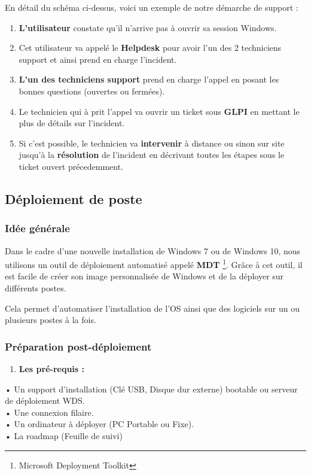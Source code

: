\documentclass[11pt,a4paper,oneside]{article}
\begin{document}
En détail du schéma ci-dessus, voici un exemple de notre démarche de support :

\begin{enumerate}
\item \textbf{L'utilisateur} constate qu'il n'arrive pas à ouvrir sa session Windows.
\item Cet utilisateur va appelé le \textbf{Helpdesk} pour avoir l'un des 2 techniciens support et ainsi prend en charge l'incident.
\item \textbf{L'un des techniciens support} prend en charge l'appel en posant les bonnes questions (ouvertes ou fermées).
\item Le technicien qui à prit l'appel va ouvrir un ticket sous \textbf{GLPI} en mettant le plus de détails sur l'incident.
\item  Si c'est possible, le technicien va \textbf{intervenir} à distance ou sinon sur site jusqu'à la \textbf{résolution} de l'incident en décrivant toutes les étapes sous le ticket ouvert précedemment.
\end{enumerate}

\newpage

\subsection{Déploiement de poste}
\subsubsection{Idée générale}

Dans le cadre d’une nouvelle installation de Windows 7 ou de Windows 10, nous utilisons un outil de déploiement automatisé appelé \textbf{MDT} \footnote{Microsoft Deployment Toolkit}.
Grâce à cet outil, il est facile de créer son image personnalisée de Windows et de la déployer sur différents postes.

Cela permet d’automatiser l’installation de l’OS ainsi que des logiciels sur un ou plusieurs postes à la fois.
\subsubsection{Préparation post-déploiement}
\begin{enumerate}
    \item \textbf{Les pré-requis :}
\end{enumerate}
•	Un support d’installation (Clé USB, Disque dur externe) bootable ou serveur de déploiement WDS. \\
•	Une connexion filaire. \\
•	Un ordinateur à déployer (PC Portable ou Fixe). \\
•	La roadmap (Feuille de suivi)
\end{document}
